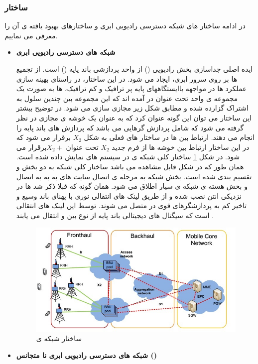 \subsubsection{ساختار }
در ادامه ساختار های شبکه دسترسی رادیویی ابری و ساختارهای بهبود یافته ی آن را معرفی می نماییم.
\begin{itemize}
\item \textbf{شبکه های دسترسی رادیویی ابری}


ایده اصلی  جداسازی بخش رادیویی () 
 از واحد پردازشی باند پایه ()
  است.
از تجمیع  ها بر روی سرور ابری،  ایجاد می شود.
در این ساختار، در راستای بهینه سازی عملکرد 
 ها در مواجهه باایستگاههای پایه پر ترافیک و کم ترافیک،
 ها به صورت یک مجموعه ی واحد تحت عنوان 
 در آمده اند که این مجموعه بین چندین سلول 
 به اشتراک گزارده شده و مطابق شکل زیر مجازی سازی
می شود. 
در توضیح بیشتر این ساختار می توان این گونه
عنوان کرد که  به عنوان یک خوشه ی مجازی
در نظر گرفته می شود که شامل پردازش گرهایی می باشد
که پردازش های باند پایه را انجام می دهند. ارتباط بین
  ها در ساختار های فعلی به شکل  $X_2$ برقرار می شود
که در این ساختار ارتباط بین خوشه ها از فرم جدید $X_2$
تحت عنوان  $X_2 +$برقرار می شود.
\newline
در شکل \ref{fig:C-RAN} ساختار کلی شبکه ی   در سیستم های
 نمایش داده شده است. همان طور که در شکل قابل
مشاهده می باشد ساختار کلی شبکه   به دو بخش
  و  تقسیم بندی شده است. بخش
 شبکه به مرحله ی اتصال سایت های به
 به  به اتصال  و بخش 
هسته ی شبکه ی سیار اطلاق می شود. همان گونه که قبلا
ذکر شد  ها در نزدیکی انتن نصب شده و از طریق
لینک های انتقالی نوری با پهنای باند وسیع و تاخیر کم به
پردازشگرهای قوی در  متصل می شوند. توسط این
لینک های انتقالی است که سیگنال های دیجیتالی باند
پایه از نوع  بین  و  انتقال می یابند \cite{checko2015cloud}.
\begin{figure}[H]
  \centering
    \includegraphics[width=\textwidth]{./fig/CRAN}
  \caption{ساختار شبکه ی  \cite{checko2015cloud}}
  \label{fig:C-RAN}
\end{figure}
\item \textbf{شبکه های دسترسی رادیویی ابری نا متجانس ()}



\end{itemize}
